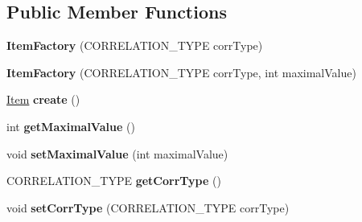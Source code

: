 \subsection*{Public Member Functions}
\begin{DoxyCompactItemize}
\item 
\hypertarget{classcom_1_1msu_1_1thief_1_1factory_1_1items_1_1ItemFactory_a24b89b712a6694887a00f5f739e4b5f9}{{\bfseries Item\-Factory} (C\-O\-R\-R\-E\-L\-A\-T\-I\-O\-N\-\_\-\-T\-Y\-P\-E corr\-Type)}\label{classcom_1_1msu_1_1thief_1_1factory_1_1items_1_1ItemFactory_a24b89b712a6694887a00f5f739e4b5f9}

\item 
\hypertarget{classcom_1_1msu_1_1thief_1_1factory_1_1items_1_1ItemFactory_a33d74d9431b732cd3125cf09bfd11f3d}{{\bfseries Item\-Factory} (C\-O\-R\-R\-E\-L\-A\-T\-I\-O\-N\-\_\-\-T\-Y\-P\-E corr\-Type, int maximal\-Value)}\label{classcom_1_1msu_1_1thief_1_1factory_1_1items_1_1ItemFactory_a33d74d9431b732cd3125cf09bfd11f3d}

\item 
\hypertarget{classcom_1_1msu_1_1thief_1_1factory_1_1items_1_1ItemFactory_a900604a0607b6a7f420c92c55b70bd1e}{\hyperlink{classcom_1_1msu_1_1thief_1_1model_1_1Item}{Item} {\bfseries create} ()}\label{classcom_1_1msu_1_1thief_1_1factory_1_1items_1_1ItemFactory_a900604a0607b6a7f420c92c55b70bd1e}

\item 
\hypertarget{classcom_1_1msu_1_1thief_1_1factory_1_1items_1_1ItemFactory_a05d9d49b785a3e97c0242e115f4ebfea}{int {\bfseries get\-Maximal\-Value} ()}\label{classcom_1_1msu_1_1thief_1_1factory_1_1items_1_1ItemFactory_a05d9d49b785a3e97c0242e115f4ebfea}

\item 
\hypertarget{classcom_1_1msu_1_1thief_1_1factory_1_1items_1_1ItemFactory_a0ffeadc85b4a9e0f61ca4a4b7c4adf48}{void {\bfseries set\-Maximal\-Value} (int maximal\-Value)}\label{classcom_1_1msu_1_1thief_1_1factory_1_1items_1_1ItemFactory_a0ffeadc85b4a9e0f61ca4a4b7c4adf48}

\item 
\hypertarget{classcom_1_1msu_1_1thief_1_1factory_1_1items_1_1ItemFactory_aa74023627934a36042ed1871255fbfaa}{C\-O\-R\-R\-E\-L\-A\-T\-I\-O\-N\-\_\-\-T\-Y\-P\-E {\bfseries get\-Corr\-Type} ()}\label{classcom_1_1msu_1_1thief_1_1factory_1_1items_1_1ItemFactory_aa74023627934a36042ed1871255fbfaa}

\item 
\hypertarget{classcom_1_1msu_1_1thief_1_1factory_1_1items_1_1ItemFactory_a9ca4d3562044df5d2657acc35d0a842b}{void {\bfseries set\-Corr\-Type} (C\-O\-R\-R\-E\-L\-A\-T\-I\-O\-N\-\_\-\-T\-Y\-P\-E corr\-Type)}\label{classcom_1_1msu_1_1thief_1_1factory_1_1items_1_1ItemFactory_a9ca4d3562044df5d2657acc35d0a842b}


\end{DoxyCompactItemize}
